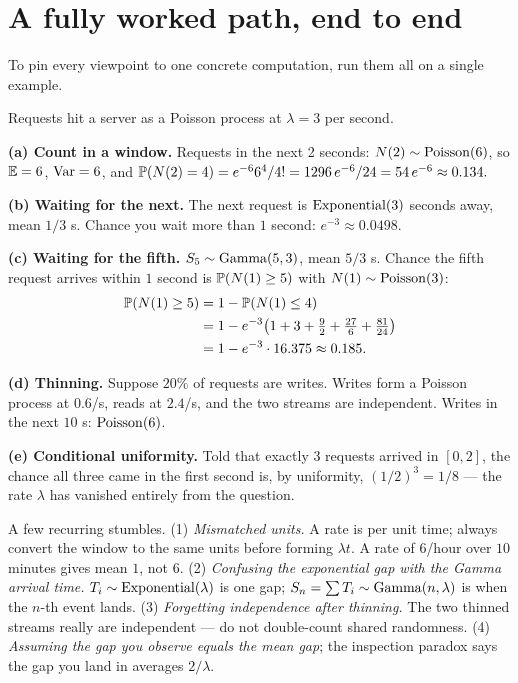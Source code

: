 \section{A fully worked path, end to end}
\label{ch25:worked-path}

To pin every viewpoint to one concrete computation, run them all on a single
example.

\begin{example}
\label{ch25:ex-server}
Requests hit a server as a Poisson process at $\lambda = 3$ per second.

\textbf{(a) Count in a window.} Requests in the next 2 seconds:
$N(2) \sim \Pois(6)$, so $\E = 6$, $\Var = 6$, and
$\P(N(2)=4) = e^{-6}6^4/4! = 1296\,e^{-6}/24 = 54\,e^{-6} \approx 0.134.$

\textbf{(b) Waiting for the next.} The next request is $\Expo(3)$ seconds away,
mean $1/3$ s. Chance you wait more than $1$ second: $e^{-3}\approx 0.0498$.

\textbf{(c) Waiting for the fifth.} $S_5\sim\Gam(5,3)$, mean $5/3$ s. Chance the
fifth request arrives within $1$ second is $\P(N(1)\ge 5)$ with
$N(1)\sim\Pois(3)$:
\begin{align*}
\P(N(1)\ge 5) &= 1 - \P(N(1) \le 4) \\
&= 1 - e^{-3}\!\left(1+3+\tfrac{9}{2}+\tfrac{27}{6}+\tfrac{81}{24}\right) \\
&= 1 - e^{-3}\cdot 16.375 \approx 0.185.
\end{align*}

\textbf{(d) Thinning.} Suppose $20\%$ of requests are writes. Writes form a
Poisson process at $0.6$/s, reads at $2.4$/s, and the two streams are
independent. Writes in the next $10$ s: $\Pois(6)$.

\textbf{(e) Conditional uniformity.} Told that exactly $3$ requests arrived in
$[0,2]$, the chance all three came in the first second is, by uniformity,
$(1/2)^3 = 1/8$ --- the rate $\lambda$ has vanished entirely from the question.
\end{example}

\begin{trapbox}
A few recurring stumbles. (1) \emph{Mismatched units.} A rate is per unit time;
always convert the window to the same units before forming $\lambda t$. A rate of
$6$/hour over $10$ minutes gives mean $1$, not $6$. (2) \emph{Confusing the
exponential gap with the Gamma arrival time.} $T_i\sim\Expo(\lambda)$ is one gap;
$S_n=\sum T_i \sim\Gam(n,\lambda)$ is when the $n$-th event lands. (3)
\emph{Forgetting independence after thinning.} The two thinned streams really are
independent --- do not double-count shared randomness. (4) \emph{Assuming the gap
you observe equals the mean gap}; the inspection paradox says the gap you land in
averages $2/\lambda$.
\end{trapbox}

